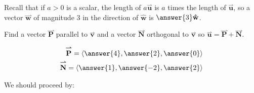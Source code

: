 \documentclass{ximera}
\begin{document}
\begin{exercise}
\begin{hint}
Recall that if $a>0$ is a scalar, the length of $a\overset{\boldsymbol{\rightharpoonup}}{\mathbf{u}}$ is $a$ times the length of $\overset{\boldsymbol{\rightharpoonup}}{\mathbf{u}}$, so a vector $\overset{\boldsymbol{\rightharpoonup}}{\mathbf{w}}$ of magnitude 3 in the direction of $\mathbf{\hat{w}}$ is $\answer{3}\mathbf{\hat{w}}$. 
\end{hint}

\begin{exercise}
Find a vector $\overset{\boldsymbol{\rightharpoonup}}{\mathbf{P}}$ parallel to $\overset{\boldsymbol{\rightharpoonup}}{\mathbf{v}}$ and a vector $\overset{\boldsymbol{\rightharpoonup}}{\mathbf{N}}$ orthogonal to $\overset{\boldsymbol{\rightharpoonup}}{\mathbf{v}}$ so $\overset{\boldsymbol{\rightharpoonup}}{\mathbf{u}} = \overset{\boldsymbol{\rightharpoonup}}{\mathbf{P}} +\overset{\boldsymbol{\rightharpoonup}}{\mathbf{N}}$.

\begin{align*}
\overset{\boldsymbol{\rightharpoonup}}{\mathbf{P}} = \left< \answer{4},\answer{2}, \answer{0} \right> \\
\overset{\boldsymbol{\rightharpoonup}}{\mathbf{N}}= \left< \answer{1},\answer{-2},\answer{2} \right> \\
\end{align*} 

\begin{hint}
 We should proceed by:
 
 \begin{multipleChoice}
 \end{multipleChoice}
 \end{hint}
 

\end{exercise}
\end{exercise}
\end{document}
